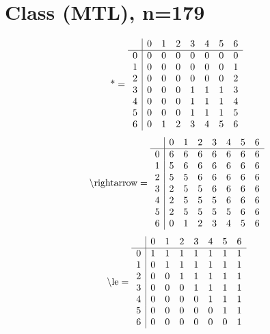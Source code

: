 \documentclass[11pt]{article}
\begin{document}
\section{Class (MTL), n=179}
\[\text{*} = 
\begin{array}{r | r r r r r r r}
 & 0 & 1 & 2 & 3 & 4 & 5 & 6 \\ \hline
0 & 0 & 0 & 0 & 0 & 0 & 0 & 0 \\
1 & 0 & 0 & 0 & 0 & 0 & 0 & 1 \\
2 & 0 & 0 & 0 & 0 & 0 & 0 & 2 \\
3 & 0 & 0 & 0 & 1 & 1 & 1 & 3 \\
4 & 0 & 0 & 0 & 1 & 1 & 1 & 4 \\
5 & 0 & 0 & 0 & 1 & 1 & 1 & 5 \\
6 & 0 & 1 & 2 & 3 & 4 & 5 & 6 \\
\end{array}
\]
\[\text{\textbackslash rightarrow} = 
\begin{array}{r | r r r r r r r}
 & 0 & 1 & 2 & 3 & 4 & 5 & 6 \\ \hline
0 & 6 & 6 & 6 & 6 & 6 & 6 & 6 \\
1 & 5 & 6 & 6 & 6 & 6 & 6 & 6 \\
2 & 5 & 5 & 6 & 6 & 6 & 6 & 6 \\
3 & 2 & 5 & 5 & 6 & 6 & 6 & 6 \\
4 & 2 & 5 & 5 & 5 & 6 & 6 & 6 \\
5 & 2 & 5 & 5 & 5 & 5 & 6 & 6 \\
6 & 0 & 1 & 2 & 3 & 4 & 5 & 6 \\
\end{array}
\]
\[\text{\textbackslash le} = 
\begin{array}{r | r r r r r r r}
 & 0 & 1 & 2 & 3 & 4 & 5 & 6 \\ \hline
0 & 1 & 1 & 1 & 1 & 1 & 1 & 1 \\
1 & 0 & 1 & 1 & 1 & 1 & 1 & 1 \\
2 & 0 & 0 & 1 & 1 & 1 & 1 & 1 \\
3 & 0 & 0 & 0 & 1 & 1 & 1 & 1 \\
4 & 0 & 0 & 0 & 0 & 1 & 1 & 1 \\
5 & 0 & 0 & 0 & 0 & 0 & 1 & 1 \\
6 & 0 & 0 & 0 & 0 & 0 & 0 & 1 \\
\end{array}
\]
\end{document}
